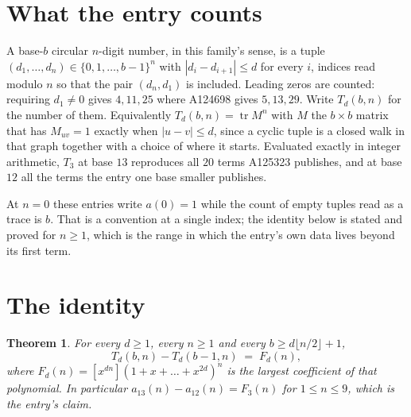\documentclass[11pt,a4paper]{article}
\theoremstyle{plain}
\newtheorem{theorem}{Theorem}
\theoremstyle{definition}
\begin{document}
\section{What the entry counts}

A base-$b$ circular $n$-digit number, in this family's sense, is a tuple
$(d_1,\dots,d_n)\in\{0,1,\dots,b-1\}^{n}$ with $|d_i-d_{i+1}|\le d$ for every $i$, indices
read modulo $n$ so that the pair $(d_n,d_1)$ is included. Leading zeros are counted: requiring
$d_1\ne0$ gives $4,11,25$ where A124698 gives $5,13,29$. Write $T_d(b,n)$ for the number of
them. Equivalently $T_d(b,n)=\operatorname{tr}M^{n}$ with $M$ the $b\times b$ matrix that has
$M_{uv}=1$ exactly when $|u-v|\le d$, since a cyclic tuple is a closed walk in that graph
together with a choice of where it starts. Evaluated exactly in integer arithmetic, $T_{3}$
at base $13$ reproduces all $20$ terms A125323 publishes, and at base $12$ all the
terms the entry one base smaller publishes.

At $n=0$ these entries write $a(0)=1$ while the count of empty tuples read as a trace is $b$.
That is a convention at a single index; the identity below is stated and proved for $n\ge1$,
which is the range in which the entry's own data lives beyond its first term.

\section{The identity}

\begin{theorem}
For every $d\ge1$, every $n\ge1$ and every $b\ge d\lfloor n/2\rfloor+1$,
\[
T_d(b,n)-T_d(b-1,n)\;=\;F_d(n),
\]
where $F_d(n)=[x^{dn}](1+x+\dots+x^{2d})^{n}$ is the largest coefficient of that
polynomial. In particular $a_{13}(n)-a_{12}(n)=F_{3}(n)$ for $1\le n\le9$, which
is the entry's claim.
\end{theorem}
\end{document}

